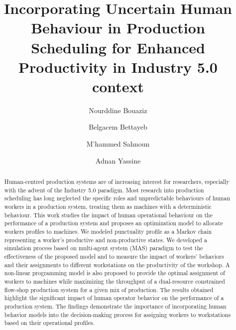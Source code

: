 \documentclass[final,12pt, 3p, times]{elsarticle}
\begin{document}
\begin{frontmatter}


\title{Incorporating Uncertain Human Behaviour in Production Scheduling for Enhanced Productivity in Industry 5.0 context}

\author[inst1]{Nourddine Bouaziz}
\author[inst2]{Belgacem Bettayeb}
\author[inst1]{M'hammed Sahnoun}
\author[inst3]{Adnan Yassine}



\begin{abstract}
Human-centred production systems are of increasing interest for researchers, especially with the advent of the Industry 5.0 paradigm. Most research into production scheduling has long neglected the specific roles and  unpredictable behaviours of human workers in a production system, treating them as machines with a deterministic behaviour. This work studies the impact of human operational behaviour on the performance of a production system and proposes an optimization model to allocate workers profiles to machines. We modeled punctuality profile as a Markov chain representing a worker's productive and non-productive states. We developed a simulation process based on multi-agent system (MAS) paradigm to test the effectiveness of the proposed model and to measure the impact of workers' behaviors and their assignments to different workstations on the productivity of the workshop. A non-linear programming model is also proposed to provide the optimal assignment of workers to machines while maximizing the throughput of a dual-resource constrained flow-shop production system for a given mix of production. The results obtained highlight the significant impact of human operator behavior on the performance of a production system. The findings demonstrate the importance of incorporating human behavior models into the decision-making process for assigning workers to workstations based on their operational profiles.
\end{abstract}
 
\end{frontmatter}
\end{document}
